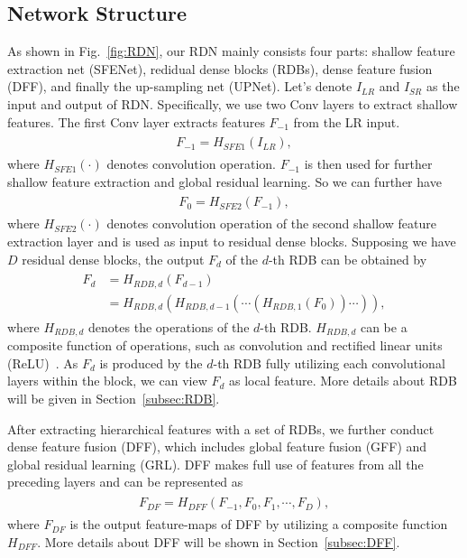 \documentclass[10pt,twocolumn,letterpaper]{article}
\begin{document}
\subsection{Network Structure}
\label{sec:network}
As shown in Fig.~\ref{fig:RDN}, our RDN mainly consists four parts: shallow feature extraction net (SFENet), redidual dense blocks (RDBs), dense feature fusion (DFF), and finally the up-sampling net (UPNet). Let's denote $I_{LR}$ and $I_{SR}$ as the input and output of RDN. Specifically, we use two Conv layers to extract shallow features. The first Conv layer extracts features $F_{-1}$ from the LR input.
\begin{align}
\begin{split}
\label{eq:SFE1}
F_{-1}=H_{SFE1}\left ( I_{LR} \right ),
\end{split}
\end{align}
where $H_{SFE1}\left ( \cdot  \right )$ denotes convolution operation. $F_{-1}$ is then used for further shallow feature extraction and global residual learning. So we can further have
\begin{align}
\begin{split}
\label{eq:SFE2}
F_{0}=H_{SFE2}\left ( F_{-1} \right ),
\end{split}
\end{align}
where $H_{SFE2}\left ( \cdot  \right )$ denotes convolution operation of the second shallow feature extraction layer and is used as input to residual dense blocks. Supposing we have $D$ residual dense blocks, the output $F_{d}$ of the $d$-th RDB can be obtained by
\begin{align}
\begin{split}
\label{eq:F_d_RDN}
F_{d}&=H_{RDB,d}\left ( F_{d-1} \right )\\
&=H_{RDB,d}\left ( H_{RDB,{d-1}}\left ( \cdots \left ( H_{RDB,1}\left ( F_{0} \right ) \right ) \cdots \right ) \right ),
\end{split}
\end{align}
where $H_{RDB,d}$ denotes the operations of the $d$-th RDB. $H_{RDB,d}$ can be a composite function of operations, such as convolution and rectified linear units (ReLU)~\cite{glorot2011deep}. As $F_{d}$ is produced by the $d$-th RDB fully utilizing each convolutional layers within the block, we can view $F_{d}$ as local feature. More details about RDB will be given in Section~\ref{subsec:RDB}.

After extracting hierarchical features with a set of RDBs, we further conduct dense feature fusion (DFF), which includes global feature fusion (GFF) and global residual learning (GRL). DFF makes full use of features from all the preceding layers and can be represented as
\begin{align}
\begin{split}
\label{eq:DFF}
F_{DF}=H_{DFF}\left ( F_{-1},F_{0},F_{1},\cdots ,F_{D} \right ),
\end{split}
\end{align}  
where $F_{DF}$ is the output feature-maps of DFF by utilizing a composite function $H_{DFF}$. More details about DFF will be shown in Section~\ref{subsec:DFF}. 
\end{document}
